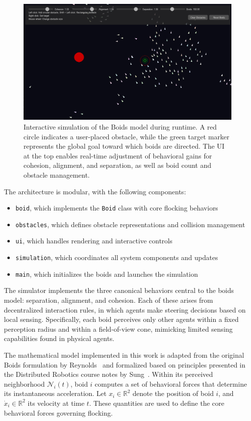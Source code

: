 \documentclass[12pt]{article}
\begin{document}
\begin{figure}[h!]
    \centering
    \includegraphics[width=0.7\linewidth]{boids_sim.png}
    \caption{Interactive simulation of the Boids model during runtime. A red circle indicates a user-placed obstacle, while the green target marker represents the global goal toward which boids are directed. The UI at the top enables real-time adjustment of behavioral gains for cohesion, alignment, and separation, as well as boid count and obstacle management.}
    \label{fig:boids_sim}
  \end{figure}

The architecture is modular, with the following components:
\begin{itemize}[nosep]
    \item \texttt{boid}, which implements the \texttt{Boid} class with core flocking behaviors
    \item \texttt{obstacles}, which defines obstacle representations and collision management
    \item \texttt{ui}, which handles rendering and interactive controls
    \item \texttt{simulation}, which coordinates all system components and updates
    \item \texttt{main}, which initializes the boids and launches the simulation
\end{itemize}

The simulator implements the three canonical behaviors central to the boids model: separation, alignment, and cohesion. Each of these arises from decentralized interaction rules, in which agents make steering decisions based on local sensing. Specifically, each boid perceives only other agents within a fixed perception radius and within a field-of-view cone, mimicking limited sensing capabilities found in physical agents.

The mathematical model implemented in this work is adapted from the original Boids formulation by Reynolds~\cite{reynolds1987flocks} and formalized based on principles presented in the Distributed Robotics course notes by Sung~\cite{sung2025distributed}. Within its perceived neighborhood \(\mathcal{N}_i(t)\), boid \(i\) computes a set of behavioral forces that determine its instantaneous acceleration. Let \(x_i \in \mathbb{R}^2\) denote the position of boid \(i\), and \(\dot{x}_i \in \mathbb{R}^2\) its velocity at time \(t\). These quantities are used to define the core behavioral forces governing flocking.
\end{document}
